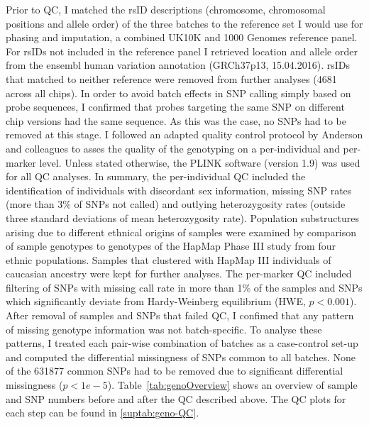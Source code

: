 Prior to QC, I matched the rsID descriptions (chromosome, chromosomal positions and allele order) of the three batches to the reference set I would use for phasing and  imputation, a combined UK10K \citep{UK10KConsortium2014} and \num{1000} Genomes \citep{Abecasis2012} reference panel. For rsIDs not included in the reference panel I retrieved location and allele order from the ensembl human variation annotation (GRCh37p13, 15.04.2016). rsIDs that matched to neither reference were removed from further analyses (\num{4681} across all chips). In order to avoid batch effects in SNP calling simply based on probe sequences, I confirmed that probes targeting the same SNP on different chip versions had the same sequence. As this was the case, no SNPs had to be removed at this stage. 
I followed an adapted quality control protocol by Anderson and colleagues \citep{Anderson2010} to asses the quality of the genotyping on a per-individual and per-marker level. Unless stated otherwise, the PLINK software (version 1.9) \citep{Purcell2007, Chang2015} was used for all QC analyses. In summary, the per-individual QC included the identification of individuals with discordant sex information, missing SNP rates (more than \num{3}\% of SNPs not called) and outlying heterozygosity rates (outside three standard deviations of mean heterozygosity rate). Population substructures arising due to different ethnical origins of samples were examined by comparison of sample genotypes to genotypes of the HapMap Phase III study \citep{HapMap2005} from four ethnic populations. Samples that clustered with HapMap III individuals of caucasian ancestry were kept for further analyses. The per-marker QC included filtering of SNPs with missing call rate in more than \num{1}\% of the samples and SNPs which significantly deviate from Hardy-Weinberg equilibrium (HWE, \(p < 0.001\)). After removal of samples and SNPs that failed QC, I confimed that any pattern of missing genotype information was not batch-specific. To analyse these patterns, I treated each pair-wise combination of batches as a case-control set-up and computed the differential missingness of SNPs common to all batches. None of the \num{631877} common SNPs had to be removed due to significant differential missingness (\(p < 1e-5\)). Table~\ref{tab:genoOverview} shows an overview of sample and SNP numbers before and after the QC described above. The QC plots for each step can be found in \cref{suptab:geno-QC}. 
\\
